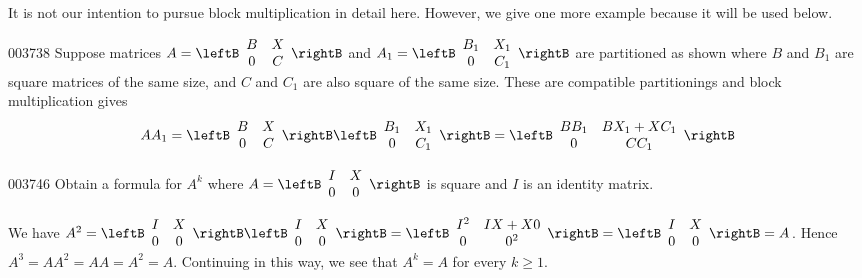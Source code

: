 It is not our intention to pursue block multiplication in detail here. However, we give one more example because it will be used below. 


\begin{theorem}{}{003738}
Suppose matrices $A = \leftB \begin{array}{cc}
B & X \\
0 & C
\end{array} \rightB$
 and $A_{1} = \leftB \begin{array}{cc}
 B_{1} & X_{1} \\
 0 & C_{1}
 \end{array} \rightB$ are partitioned as shown where $B$ and $B_{1}$ are square matrices of the same size, and $C$ and $C_{1}$ are also square of the same size. These are compatible partitionings and block multiplication gives
\begin{equation*}
AA_{1} = \leftB \begin{array}{cc}
B & X \\
0 & C
\end{array} \rightB \leftB \begin{array}{cc}
B_{1} & X_{1} \\
0 & C_{1}
\end{array} \rightB = \leftB \begin{array}{cc}
BB_{1} & BX_{1} + XC_{1} \\
0 & CC_{1}
\end{array} \rightB
\end{equation*}
\end{theorem}

\begin{example}{}{003746}
Obtain a formula for $A^{k}$ where $A = \leftB \begin{array}{cc}
I & X \\
0 & 0
\end{array} \rightB$
 is square and $I$ is an identity matrix.


\begin{solution}
  We have $A^{2} = \leftB \begin{array}{cc}
  I & X \\
  0 & 0
  \end{array} \rightB \leftB \begin{array}{cc}
  I & X \\
  0 & 0
  \end{array} \rightB = \leftB \begin{array}{cc}
  I^{2} & IX + X0 \\
  0 & 0^{2}
  \end{array} \rightB = \leftB \begin{array}{cc}
  I & X \\
  0 & 0
  \end{array} \rightB = A$. Hence $A^{3} = AA^{2} = AA = A^{2} = A$. Continuing in this way, we see that $A^{k} = A$ for every $k \geq 1$.
\end{solution}
\end{example}

